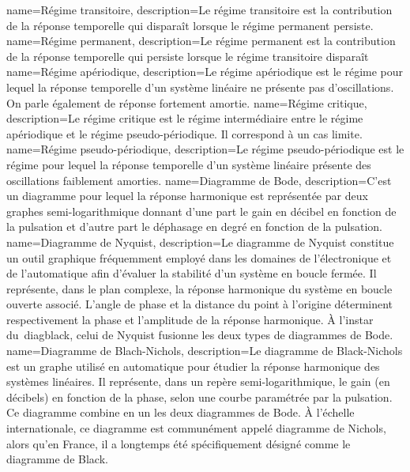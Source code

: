%
{%
  name={Régime transitoire},%
  description={Le régime transitoire est la contribution de la réponse 
  temporelle qui disparaît lorsque le régime permanent persiste.
  }
}
%
{%
  name={Régime permanent},%
  description={Le régime permanent est la contribution de la réponse temporelle 
  qui persiste lorsque le régime transitoire disparaît
  }
}
%
{%
  name={Régime apériodique},%
  description={Le régime apériodique est le régime pour lequel la réponse 
  temporelle d'un système linéaire ne présente pas d'oscillations. On parle
  également de réponse fortement amortie.
  }
}
%
{%
  name={Régime critique},%
  description={Le régime critique est le régime intermédiaire entre le régime
      apériodique et le régime pseudo-périodique. Il correspond à un cas limite.
  }
}
%
{%
  name={Régime pseudo-périodique},%
  description={Le régime pseudo-périodique est le régime pour lequel la réponse
  temporelle d'un système linéaire présente des oscillations faiblement 
  amorties.
  }
}
%
{%
  name={Diagramme de Bode},%
  description={C'est un diagramme pour lequel la réponse harmonique est 
  représentée par deux graphes semi-logarithmique donnant d'une part le gain 
  en décibel en fonction de la pulsation et d'autre part le déphasage en degré
  en fonction de la pulsation.
  }
}
%
{%
  name={Diagramme de Nyquist},%
  description={Le diagramme de Nyquist constitue un outil graphique fréquemment 
               employé dans les domaines de l'électronique et de l'automatique 
               afin d'évaluer la stabilité d'un système en boucle fermée. Il 
               représente, dans le plan complexe, la réponse harmonique du 
               système en boucle ouverte associé. L'angle de phase et la 
               distance du point à l'origine déterminent respectivement 
               la phase et l'amplitude de la réponse harmonique. 
               À l'instar du~\gls{diagblack}, celui de Nyquist fusionne 
               les deux types de diagrammes de Bode.} 
}
%
{%
  name={Diagramme de Blach-Nichols},%
  description={Le diagramme de Black-Nichols est un graphe 
               utilisé en automatique pour étudier la réponse harmonique
               des systèmes linéaires. Il représente, dans un repère 
               semi-logarithmique, le gain (en décibels) en fonction 
               de la phase, selon une courbe paramétrée par la pulsation. 
               Ce diagramme combine en un les deux diagrammes de Bode. 
               À l'échelle internationale, ce diagramme est communément 
               appelé diagramme de Nichols, alors qu'en France, 
               il a longtemps été spécifiquement désigné comme le 
               diagramme de Black.}
}
